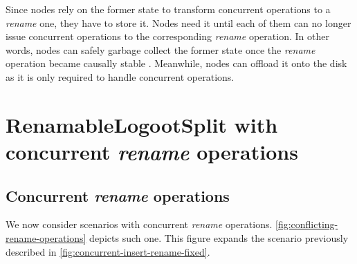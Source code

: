 \documentclass[10pt,journal,compsoc]{IEEEtran}
\begin{document}
Since nodes rely on the former state to transform concurrent operations to a \emph{rename} one, they have to store it.
Nodes need it until each of them can no longer issue concurrent operations to the corresponding \emph{rename} operation.
In other words, nodes can safely garbage collect the former state once the \emph{rename} operation became causally stable \cite{10.1007/978-3-662-43352-2_11}.
Meanwhile, nodes can offload it onto the disk as it is only required to handle concurrent operations.


\section{RenamableLogootSplit with concurrent \emph{rename} operations}

\label{sec:distributed-rls}

\subsection{Concurrent \emph{rename} operations}

We now consider scenarios with concurrent \emph{rename} operations.
\autoref{fig:conflicting-rename-operations} depicts such one.
This figure expands the scenario previously described in \autoref{fig:concurrent-insert-rename-fixed}.
\end{document}
